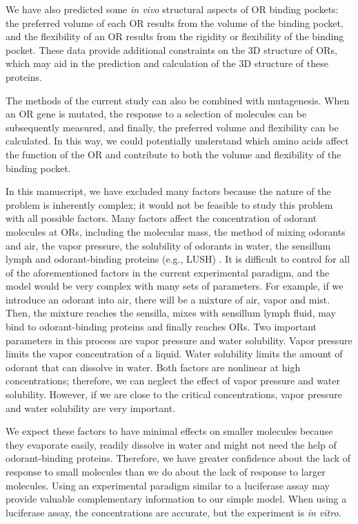 \documentclass[fleqn,11pt]{wlscirep}
\begin{document}
We have also predicted some {\it in vivo} structural aspects of OR binding pockets:
the preferred volume of each OR results from the volume of the binding pocket, and the flexibility of an OR results from the rigidity or flexibility of the binding pocket. 
These data provide additional constraints on the 3D structure of ORs, 
which may aid in the prediction and calculation of the 3D structure of these proteins. 

The methods of the current study can also be combined with mutagenesis. 
When an OR gene is mutated, 
the response to a selection of molecules can be subsequently measured, and finally, the preferred volume and flexibility can be calculated.
In this way, we could potentially understand which amino acids affect the function of the OR and contribute to both the volume and flexibility of the binding pocket.

In this manuscript, we have excluded many factors 
because the nature of the problem is inherently complex; it would not be feasible to study this problem with all possible factors. 
Many factors affect the concentration of odorant molecules at ORs, 
including the molecular mass, the method of mixing odorants and air, the vapor pressure, the solubility of odorants in water, the sensillum lymph and odorant-binding proteins (e.g., LUSH) \cite{xu2005drosophila,gomez2013ligands}. 
It is difficult to control for all of the aforementioned factors in the current experimental paradigm, and the model would be very complex with many sets of parameters. 
For example, if we introduce an odorant into air, there will be a mixture of air, vapor and mist. Then, 
the mixture reaches  the sensilla, 
mixes with sensillum lymph fluid, 
may bind to odorant-binding proteins and finally reaches ORs. 
Two important parameters in this process are vapor pressure and water solubility. 
Vapor pressure limits the vapor concentration of a liquid. 
Water solubility limits the amount of odorant that can dissolve in water. 
Both factors are nonlinear at high concentrations; therefore, 
we can neglect the effect of vapor pressure and water solubility. However, 
if we are close to the critical concentrations, 
vapor pressure and water solubility are very important. 

We expect these factors to have minimal effects on smaller molecules 
because they evaporate easily, readily dissolve in water and might not need the help of odorant-binding proteins. 
Therefore, we have greater confidence about the lack of response to small molecules than we do about the lack of response to larger molecules. 
Using an experimental paradigm similar to a luciferase assay \cite{mainland2015human} 
may provide valuable complementary information to our simple model. 
When using a luciferase assay, the concentrations are accurate, but the experiment is {\it in vitro}. 
\end{document}

